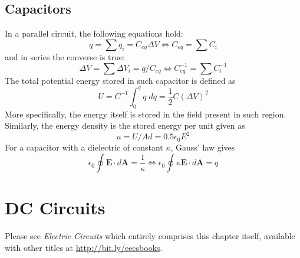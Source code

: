 \documentclass[oneside,11pt]{book}
\renewcommand{\b}{\mathbf}
\begin{document}
\section{Capacitors}
In a parallel circuit, the following equations hold: \begin{equation}
    q = \sum q_i = C_{eq} \Delta V \iff C_{eq} = \sum C_i
\end{equation}
and in series the converse is true: \begin{equation}
    \Delta V = \sum \Delta V_i = q / C_{eq} \iff C_{eq}^{-1} = \sum C_i^{-1}
\end{equation}
The total potential energy stored in such capacitor is defined as \begin{equation}
    U = C^{-1} \int_0^q q \; dq = \textstyle{\frac{1}{2}} C (\Delta V)^2
\end{equation}
More specifically, the energy itself is stored in the field present in such region. Similarly, the energy density is the stored energy per unit given as \begin{equation}
    u = U/Ad = 0.5 \epsilon_0 E^2
\end{equation}
For a capacitor with a dielectric of constant $\kappa$, Gauss' law gives \begin{equation}
    \epsilon_0 \oint \b E \cdot d \b A = \frac{1}{\kappa} \iff \epsilon_0 \oint \kappa \b E \cdot d \b A = q
\end{equation}

\chapter{DC Circuits}
Please see \textit{Electric Circuits} which entirely comprises this chapter itself, available with other titles at \url{http://bit.ly/eecsbooks}.
\end{document}
